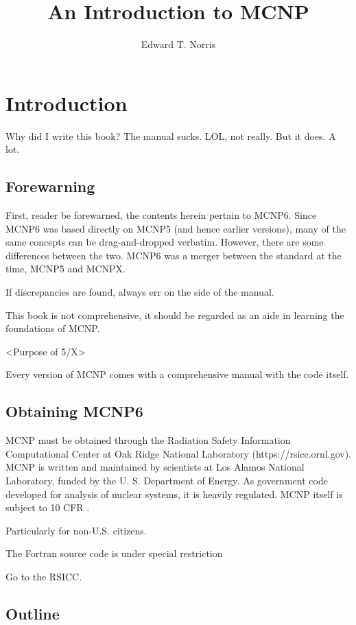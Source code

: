 \documentclass[10pt,a4paper]{book}
\author{Edward T. Norris}
\title{An Introduction to MCNP}
\begin{document}
\maketitle

\tableofcontents

\chapter{Introduction}

Why did I write this book? The manual sucks. LOL, not really. But it does. A lot.

\section{Forewarning}
First, reader be forewarned, the contents herein pertain to MCNP6. Since MCNP6 was based directly on MCNP5 (and hence earlier versions), many of the same concepts can be drag-and-dropped verbatim. However, there are some differences between the two. MCNP6 was a merger between the standard at the time, MCNP5 and MCNPX.

If discrepancies are found, always err on the side of the manual.

This book is not comprehensive, it should be regarded as an aide in learning the foundations of MCNP.

<Purpose of 5/X>

Every version of MCNP comes with a comprehensive manual with the code itself.

\section{Obtaining MCNP6}

MCNP must be obtained through the Radiation Safety Information Computational Center at Oak Ridge National Laboratory (https://rsicc.ornl.gov). MCNP is written and maintained by scientists at Los Alamos National Laboratory, funded by the U. S. Department of Energy. As government code developed for analysis of nuclear systems, it is heavily regulated. MCNP itself is subject to 10 CFR .

Particularly for non-U.S. citizens.

The Fortran source code is under special restriction

Go to the RSICC.

\section{Outline}
\end{document}
